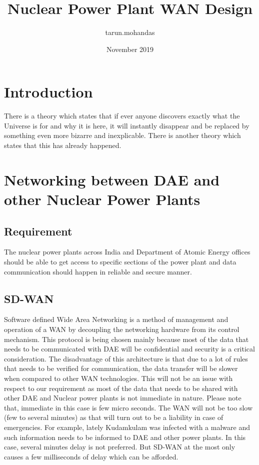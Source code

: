 \documentclass{article}
\title{Nuclear Power Plant WAN Design}
\author{tarun.mohandas }
\date{November 2019}
\begin{document}
\maketitle

\section{Introduction}
There is a theory which states that if ever anyone discovers exactly what the Universe is for and why it is here, it will instantly disappear and be replaced by something even more bizarre and inexplicable.
There is another theory which states that this has already happened.

\section{Networking between DAE and other Nuclear Power Plants}
\subsection{Requirement}
The nuclear power plants across India and Department of Atomic Energy offices should be able to get access to specific sections of the power plant and data communication should happen in reliable and secure manner.
\subsection{SD-WAN}
Software defined Wide Area Networking is a method of management and operation of a WAN by decoupling the networking hardware from its control mechanism. This protocol is being chosen mainly because most of the data that needs to be communicated with DAE will be confidential and security is a critical consideration. The disadvantage of this architecture is that due to a lot of rules that needs to be verified for communication, the data transfer will be slower when compared to other WAN technologies. This will not be an issue with respect to our requirement as most of the data that needs to be shared with other DAE and Nuclear power plants is not immediate in nature. Please note that, immediate in this case is few micro seconds. The WAN will not be too slow (few to several minutes) as that will turn out to be a liability in case of emergencies. For example, lately Kudamkulam was infected with a malware and such information needs to be informed to DAE and other power plants. In this case, several minutes delay is not preferred. But SD-WAN at the most only causes a few milliseconds of delay which can be afforded.
\end{document}
